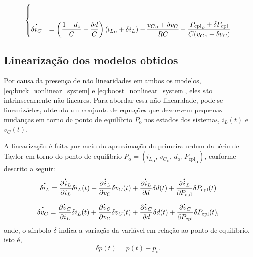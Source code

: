 \begin{equation}
\begin{cases}
    \\[12pt]
    
    \dt{\delta {v}_C} &= \displaystyle \left( \frac{1 - d_{\mathrm{o}}}{C} - \frac{\delta d}{C} \right)\left({i_L}_{\mathrm{o}} + \delta i_L\right) - \frac{{v_C}_{\mathrm{o}} + \delta v_C}{RC} - \frac{{{P_{\mathrm{cpl}}}_{\mathrm{o}} + \delta P_{\mathrm{cpl}}}}{C({v_C}_{\mathrm{o}} + \delta {v_C})}
  \end{cases}
\end{equation}

\subsection{Linearização dos modelos obtidos}

Por causa da presença de não linearidades em ambos os modelos, \eqref{eq:buck_nonlinear_system} e \eqref{eq:boost_nonlinear_system}, eles são intrinsecamente não lineares. Para abordar essa não linearidade, pode-se linearizá-los, obtendo um conjunto de equações que descrevem pequenas mudanças em torno do ponto de equilíbrio $P_{\mathrm{o}}$ nos estados dos sistemas, $i_L(t)$ e $v_C(t)$.

A linearização é feita por meio da aproximação de primeira ordem da série de Taylor em torno do ponto de equilíbrio $P_{\mathrm{o}} = ({i_L}_{\mathrm{o}}, \, {v_C}_{\mathrm{o}}, \, {d}_{\mathrm{o}}, \, {P_{\mathrm{cpl}}}_{\mathrm{o}})$, conforme descrito a seguir: \begin{gather}  \dt{\delta i_L} = \frac{\partial \dt{i}_L}{\partial i_L}\delta i_L(t) + \frac{\partial \dt{i}_L}{\partial v_C}\delta v_C(t) + \frac{\partial {\dt{i}_L}}{\partial d}\delta d(t) + \frac{\partial {\dt{i}_L}}{\partial P_{\mathrm{cpl}}}\delta P_{\mathrm{cpl}}(t) \\ \nonumber \\ \dt{\delta v_C} = \frac{\partial \dt{v}_C}{\partial i_L}\delta i_L(t) + \frac{\partial \dt{v}_C}{\partial v_C}\delta v_C(t) + \frac{\partial \dt{v}_C}{\partial d}\delta d(t) + \frac{\partial \dt{v}_C}{\partial P_{\mathrm{cpl}}}\delta P_{\mathrm{cpl}}(t), \end{gather} onde, o símbolo $\delta$ indica a variação da variável em relação ao ponto de equilíbrio, isto é, \begin{equation} \delta p(t) = p(t) - p_{\mathrm{o}}. \label{eq:delta}\end{equation}

